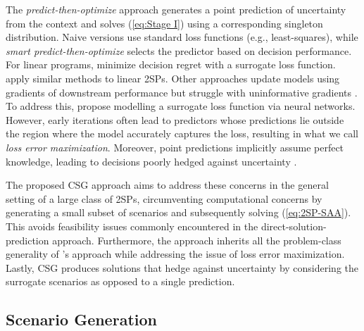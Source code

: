 The \textit{predict-then-optimize} approach generates a point prediction of uncertainty from the context and solves (\ref{eq:Stage I}) using a corresponding singleton distribution. Naive versions use standard loss functions (e.g., least-squares), while \textit{smart predict-then-optimize} selects the predictor based on decision performance. For linear programs, \citet{elmachtoub2021smart} minimize decision regret with a surrogate loss function. \citet{estes2023smart} apply similar methods to linear 2SPs. Other approaches update models using gradients of downstream performance \citep{agrawal2019differentiable} but struggle with uninformative gradients \citep{grigas2021integrated, zharmagambetov2023landscape}. To address this, \citet{zharmagambetov2023landscape} propose modelling a surrogate loss function via neural networks. However, early iterations often lead to predictors whose predictions lie outside the region where the model accurately captures the loss, resulting in what we call \textit{loss error maximization}. Moreover, point predictions implicitly assume perfect knowledge, leading to decisions poorly hedged against uncertainty \citep{king2012modeling}.

The proposed CSG approach aims to address these concerns in the general setting of a large class of 2SPs, circumventing computational concerns by generating a small subset of scenarios and subsequently solving (\ref{eq:2SP-SAA}). This avoids feasibility issues commonly encountered in the direct-solution-prediction approach. Furthermore, the approach inherits all the problem-class generality of \citet{zharmagambetov2023landscape}'s approach while addressing the issue of loss error maximization. Lastly, CSG produces solutions that hedge against uncertainty by considering the surrogate scenarios as opposed to a single prediction.


\subsection{Scenario Generation}

